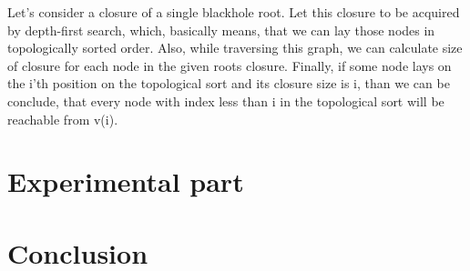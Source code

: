 \documentclass{svproc}
\begin{document}
Let's consider a closure of a single blackhole root. Let this closure to be acquired by depth-first search, which, basically means, that
we can lay those nodes in topologically sorted order. Also, while traversing this graph, we can calculate size of closure for each node
in the given roots closure. Finally, if some node lays on the i'th position on the topological sort and its closure size is i, than we can
be conclude, that every node with index less than i in the topological sort will be reachable from v(i).

%

%
\section{Experimental part}
%

%
\section{Conclusion}
%

%
%


\end{document}
